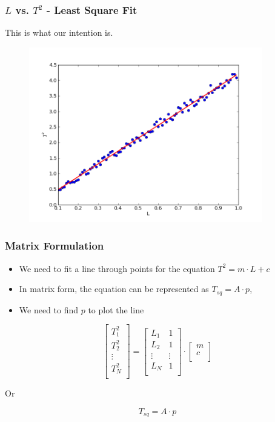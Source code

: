\documentclass[14pt,compress]{beamer}
\begin{document}
\begin{frame}[fragile]
\frametitle{$L$ vs. $T^2$ - Least Square Fit}
This is what our intention is.
\vspace{-0.1in}
\begin{figure}
\includegraphics[width=4in]{data/least-sq-fit}
\end{figure}
\end{frame}

\begin{frame}[fragile]
\frametitle{Matrix Formulation}
\begin{itemize}
\item We need to fit a line through points for the equation $T^2 = m \cdot L+c$
\item In matrix form, the equation can be represented as $T_{sq} = A \cdot p$,
\item We need to find $p$ to plot the line
\end{itemize}
\end{frame}

\begin{frame}
  \begin{equation}
  \begin{bmatrix}
  T^2_1 \\
  T^2_2 \\
  \vdots\\
  T^2_N \\
\end{bmatrix}
= \begin{bmatrix}
  L_1 & 1 \\
  L_2 & 1 \\
  \vdots & \vdots\\
  L_N & 1 \\
\end{bmatrix} \cdot
\begin{bmatrix}
  m\\
  c\\
  \end{bmatrix}
\end{equation}

Or

\[T_{sq} = A \cdot p \]

\end{frame}
\end{document}
